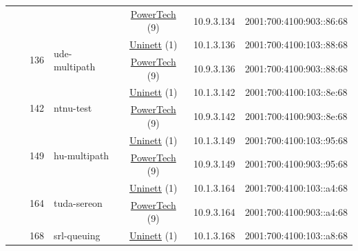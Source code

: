 \begin{small}
\begin{center}
\begin{longtable}{|c|c|c|c|c|c|c|c|}
  &  &  &  & \multicolumn{2}{|c|}{\tiny{\href{http://www.powertech.no}{PowerTech} (9)}} & \tiny{10.9.3.134} & \tiny{2001:700:4100:903::86:68} \\* \cline{3-3}\cline{4-4}\cline{5-5}\cline{6-6}\cline{7-7}\cline{8-8}
  &  & \multirow{2}{*}{\tiny{136}} & \multicolumn{1}{|l|}{\multirow{2}{*}{\tiny{ude-multipath}}} & \multicolumn{2}{|c|}{\tiny{\href{https://www.uninett.no}{Uninett} (1)}} & \tiny{10.1.3.136} & \tiny{2001:700:4100:103::88:68} \\* \cline{5-5}\cline{6-6}\cline{7-7}\cline{8-8}
  &  &  &  & \multicolumn{2}{|c|}{\tiny{\href{http://www.powertech.no}{PowerTech} (9)}} & \tiny{10.9.3.136} & \tiny{2001:700:4100:903::88:68} \\* \cline{3-3}\cline{4-4}\cline{5-5}\cline{6-6}\cline{7-7}\cline{8-8}
  &  & \multirow{2}{*}{\tiny{142}} & \multicolumn{1}{|l|}{\multirow{2}{*}{\tiny{ntnu-test}}} & \multicolumn{2}{|c|}{\tiny{\href{https://www.uninett.no}{Uninett} (1)}} & \tiny{10.1.3.142} & \tiny{2001:700:4100:103::8e:68} \\* \cline{5-5}\cline{6-6}\cline{7-7}\cline{8-8}
  &  &  &  & \multicolumn{2}{|c|}{\tiny{\href{http://www.powertech.no}{PowerTech} (9)}} & \tiny{10.9.3.142} & \tiny{2001:700:4100:903::8e:68} \\* \cline{3-3}\cline{4-4}\cline{5-5}\cline{6-6}\cline{7-7}\cline{8-8}
  &  & \multirow{2}{*}{\tiny{149}} & \multicolumn{1}{|l|}{\multirow{2}{*}{\tiny{hu-multipath}}} & \multicolumn{2}{|c|}{\tiny{\href{https://www.uninett.no}{Uninett} (1)}} & \tiny{10.1.3.149} & \tiny{2001:700:4100:103::95:68} \\* \cline{5-5}\cline{6-6}\cline{7-7}\cline{8-8}
  &  &  &  & \multicolumn{2}{|c|}{\tiny{\href{http://www.powertech.no}{PowerTech} (9)}} & \tiny{10.9.3.149} & \tiny{2001:700:4100:903::95:68} \\* \cline{3-3}\cline{4-4}\cline{5-5}\cline{6-6}\cline{7-7}\cline{8-8}
  &  & \multirow{2}{*}{\tiny{164}} & \multicolumn{1}{|l|}{\multirow{2}{*}{\tiny{tuda-sereon}}} & \multicolumn{2}{|c|}{\tiny{\href{https://www.uninett.no}{Uninett} (1)}} & \tiny{10.1.3.164} & \tiny{2001:700:4100:103::a4:68} \\* \cline{5-5}\cline{6-6}\cline{7-7}\cline{8-8}
  &  &  &  & \multicolumn{2}{|c|}{\tiny{\href{http://www.powertech.no}{PowerTech} (9)}} & \tiny{10.9.3.164} & \tiny{2001:700:4100:903::a4:68} \\* \cline{3-3}\cline{4-4}\cline{5-5}\cline{6-6}\cline{7-7}\cline{8-8}
  &  & \multirow{2}{*}{\tiny{168}} & \multicolumn{1}{|l|}{\multirow{2}{*}{\tiny{srl-queuing}}} & \multicolumn{2}{|c|}{\tiny{\href{https://www.uninett.no}{Uninett} (1)}} & \tiny{10.1.3.168} & \tiny{2001:700:4100:103::a8:68} \\* \cline{5-5}\cline{6-6}\cline{7-7}\cline{8-8}

\end{longtable}
\end{center}
\end{small}
